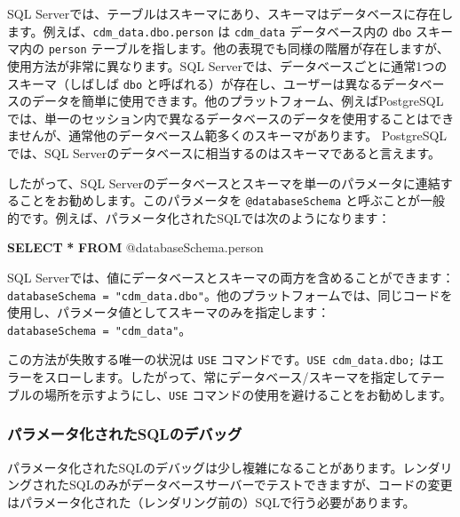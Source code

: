 \documentclass[
  11pt]{book}
\newenvironment{Shaded}{\begin{snugshade}}{\end{snugshade}}
\newcommand{\KeywordTok}[1]{\textcolor[rgb]{0.13,0.29,0.53}{\textbf{#1}}}
\newcommand{\NormalTok}[1]{#1}
\newcommand{\OperatorTok}[1]{\textcolor[rgb]{0.81,0.36,0.00}{\textbf{#1}}}
\theoremstyle{definition}
\theoremstyle{definition}
\theoremstyle{definition}
\theoremstyle{definition}
\theoremstyle{remark}
\begin{document}
SQL Serverでは、テーブルはスキーマにあり、スキーマはデータベースに存在します。例えば、\texttt{cdm\_data.dbo.person} は \texttt{cdm\_data} データベース内の \texttt{dbo} スキーマ内の \texttt{person} テーブルを指します。他の表現でも同様の階層が存在しますが、使用方法が非常に異なります。SQL Serverでは、データベースごとに通常1つのスキーマ（しばしば \texttt{dbo} と呼ばれる）が存在し、ユーザーは異なるデータベースのデータを簡単に使用できます。他のプラットフォーム、例えばPostgreSQLでは、単一のセッション内で異なるデータベースのデータを使用することはできませんが、通常他のデータベースム範多くのスキーマがあります。 PostgreSQLでは、SQL Serverのデータベースに相当するのはスキーマであると言えます。

したがって、SQL Serverのデータベースとスキーマを単一のパラメータに連結することをお勧めします。このパラメータを \texttt{@databaseSchema} と呼ぶことが一般的です。例えば、パラメータ化されたSQLでは次のようになります：

\begin{Shaded}
\begin{Highlighting}[]
\KeywordTok{SELECT} \OperatorTok{*} \KeywordTok{FROM}\NormalTok{ @databaseSchema.person}
\end{Highlighting}
\end{Shaded}

SQL Serverでは、値にデータベースとスキーマの両方を含めることができます：\texttt{databaseSchema\ =\ "cdm\_data.dbo"}。他のプラットフォームでは、同じコードを使用し、パラメータ値としてスキーマのみを指定します：\texttt{databaseSchema\ =\ "cdm\_data"}。

この方法が失敗する唯一の状況は \texttt{USE} コマンドです。\texttt{USE\ cdm\_data.dbo;} はエラーをスローします。したがって、常にデータベース/スキーマを指定してテーブルの場所を示すようにし、\texttt{USE} コマンドの使用を避けることをお勧めします。

\subsubsection*{パラメータ化されたSQLのデバッグ}\label{ux30d1ux30e9ux30e1ux30fcux30bfux5316ux3055ux308cux305fsqlux306eux30c7ux30d0ux30c3ux30b0}

パラメータ化されたSQLのデバッグは少し複雑になることがあります。レンダリングされたSQLのみがデータベースサーバーでテストできますが、コードの変更はパラメータ化された（レンダリング前の）SQLで行う必要があります。 
\end{document}
